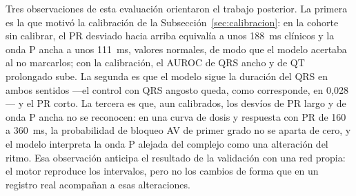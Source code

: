 \begin{spacing}{1.5}
\begin{table}[H]
\centering
{}
\caption{AUROC de cada subgrupo contra los sujetos sanos en la probabilidad de la etiqueta de ECGFounder correspondiente, en la cohorte original y en la calibrada con PTB-XL+.}
\label{tab:ecgfounder}
\end{table}

Tres observaciones de esta evaluación orientaron el trabajo posterior. La primera es la que motivó la calibración de la Subsección~\ref{sec:calibracion}: en la cohorte sin calibrar, el PR desviado hacia arriba equivalía a unos 188~ms clínicos y la onda P ancha a unos 111~ms, valores normales, de modo que el modelo acertaba al no marcarlos; con la calibración, el AUROC de QRS ancho y de QT prolongado sube. La segunda es que el modelo sigue la duración del QRS en ambos sentidos ---el control con QRS angosto queda, como corresponde, en 0,028--- y el PR corto. La tercera es que, aun calibrados, los desvíos de PR largo y de onda P ancha no se reconocen: en una curva de dosis y respuesta con PR de 160 a 360~ms, la probabilidad de bloqueo AV de primer grado no se aparta de cero, y el modelo interpreta la onda P alejada del complejo como una alteración del ritmo. Esa observación anticipa el resultado de la validación con una red propia: el motor reproduce los intervalos, pero no los cambios de forma que en un registro real acompañan a esas alteraciones.

\end{spacing}

\newpage
